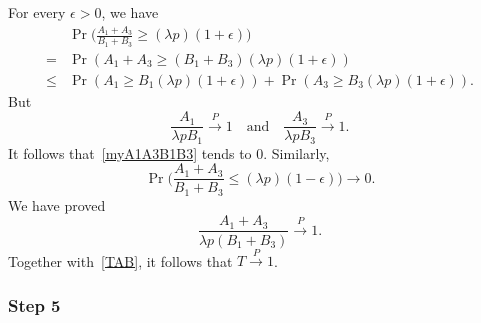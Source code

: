 \documentclass[review]{elsarticle}
\theoremstyle{plain}
\theoremstyle{definition}
\theoremstyle{remark}
\begin{document}
For every $\epsilon>0$, we have
\begin{equation}\label{myA1A3B1B3}
    \begin{aligned}
        &\Pr\Big(\frac{A_1+A_3}{B_1+B_3}\geq (\lambda p)(1+\epsilon)\Big)\\
        =&\Pr({A_1+A_3}\geq ({B_1+B_3})(\lambda p)(1+\epsilon))\\
        \leq&\Pr(A_1\geq B_1(\lambda p)(1+\epsilon))+
        \Pr(A_3\geq B_3(\lambda p)(1+\epsilon)).
    \end{aligned}
\end{equation}
But
\begin{equation}
    \frac{A_1}{\lambda p B_1}\xrightarrow{P}1\quad \textrm{and}\quad 
    \frac{A_3}{\lambda p B_3}\xrightarrow{P}1.
\end{equation}
It follows that~\eqref{myA1A3B1B3} tends to $0$. Similarly,
\begin{equation}
        \Pr\Big(\frac{A_1+A_3}{B_1+B_3}\leq (\lambda p)(1-\epsilon)\Big)\to 0.
\end{equation}
We have proved
\begin{equation}\label{largeNumberAB}
    \frac{A_1+A_3}{\lambda p(B_1+B_3)}\xrightarrow{P} 1.
\end{equation}
Together with~\eqref{TAB}, it follows that $T\xrightarrow{P} 1$.



\subsubsection{Step 5}
\end{document}
